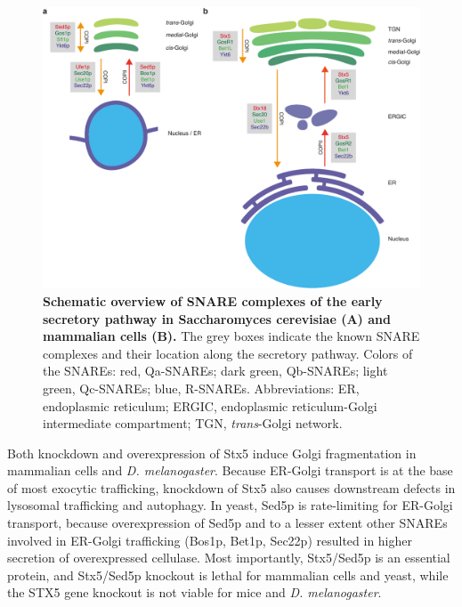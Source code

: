 \begin{figure}
    \includegraphics[keepaspectratio=true,width=\textwidth,height=\textheight]{chapters/chapter5/chapter5_Figure2}
    \caption{\textbf{Schematic overview of SNARE complexes of the early secretory pathway in Saccharomyces cerevisiae (A) and mammalian cells (B).} The grey boxes indicate the known SNARE complexes and their location along the secretory pathway. Colors of the SNAREs: red, Qa-SNAREs; dark green, Qb-SNAREs; light green, Qc-SNAREs; blue, R-SNAREs. Abbreviations: ER, endoplasmic reticulum; ERGIC, endoplasmic reticulum-Golgi intermediate compartment; TGN, \emph{trans}-Golgi network.}
    \label{fig:ch5fig2}
\end{figure}

Both knockdown and overexpression of Stx5 induce Golgi fragmentation in mammalian cells\cite{dascher_syntaxin_1994,suga_rna_2005,amessou_syntaxin_2007} and \emph{D. melanogaster}\cite{zhao_sec22_2015}. Because ER-Golgi transport is at the base of most exocytic trafficking, knockdown of Stx5 also causes downstream defects in lysosomal trafficking and autophagy\cite{renna_autophagic_2011}. In yeast, Sed5p is rate-limiting for ER-Golgi transport, because overexpression of Sed5p and to a lesser extent other SNAREs involved in ER-Golgi trafficking (Bos1p, Bet1p, Sec22p) resulted in higher secretion of overexpressed cellulase\cite{van_zyl_overexpression_2016}. Most importantly, Stx5/Sed5p is an essential protein, and Stx5/Sed5p knockout is lethal for mammalian cells\cite{blomen_gene_2015} and yeast\cite{winzeler_functional_1999}, while the STX5 gene knockout is not viable for mice\cite{koscielny_international_2014} and \emph{D. melanogaster}\cite{xu_syntaxin_2002}. 

